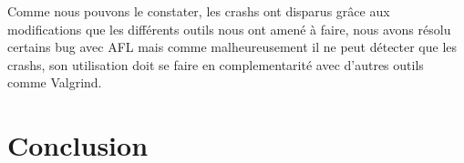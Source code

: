 \documentclass{report}
\begin{document}
Comme nous pouvons le constater, les crashs ont disparus grâce aux modifications que les différents outils nous ont amené à faire, nous avons résolu certains bug avec AFL mais comme malheureusement il ne peut détecter que les crashs, son utilisation doit se faire en complementarité avec d'autres outils comme Valgrind.

\chapter{Conclusion}
\end{document}
